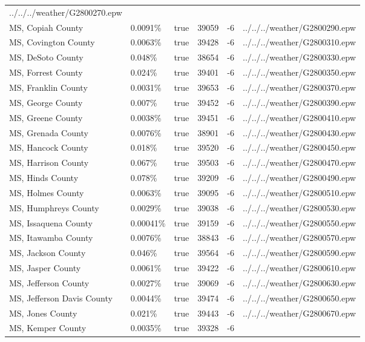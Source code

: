 \begin{longtable}[]{@{}llllll@{}}
../../../weather/G2800270.epw \\
MS, Copiah County & 0.0091\% & true & 39059 & -6 &
../../../weather/G2800290.epw \\
MS, Covington County & 0.0063\% & true & 39428 & -6 &
../../../weather/G2800310.epw \\
MS, DeSoto County & 0.048\% & true & 38654 & -6 &
../../../weather/G2800330.epw \\
MS, Forrest County & 0.024\% & true & 39401 & -6 &
../../../weather/G2800350.epw \\
MS, Franklin County & 0.0031\% & true & 39653 & -6 &
../../../weather/G2800370.epw \\
MS, George County & 0.007\% & true & 39452 & -6 &
../../../weather/G2800390.epw \\
MS, Greene County & 0.0038\% & true & 39451 & -6 &
../../../weather/G2800410.epw \\
MS, Grenada County & 0.0076\% & true & 38901 & -6 &
../../../weather/G2800430.epw \\
MS, Hancock County & 0.018\% & true & 39520 & -6 &
../../../weather/G2800450.epw \\
MS, Harrison County & 0.067\% & true & 39503 & -6 &
../../../weather/G2800470.epw \\
MS, Hinds County & 0.078\% & true & 39209 & -6 &
../../../weather/G2800490.epw \\
MS, Holmes County & 0.0063\% & true & 39095 & -6 &
../../../weather/G2800510.epw \\
MS, Humphreys County & 0.0029\% & true & 39038 & -6 &
../../../weather/G2800530.epw \\
MS, Issaquena County & 0.00041\% & true & 39159 & -6 &
../../../weather/G2800550.epw \\
MS, Itawamba County & 0.0076\% & true & 38843 & -6 &
../../../weather/G2800570.epw \\
MS, Jackson County & 0.046\% & true & 39564 & -6 &
../../../weather/G2800590.epw \\
MS, Jasper County & 0.0061\% & true & 39422 & -6 &
../../../weather/G2800610.epw \\
MS, Jefferson County & 0.0027\% & true & 39069 & -6 &
../../../weather/G2800630.epw \\
MS, Jefferson Davis County & 0.0044\% & true & 39474 & -6 &
../../../weather/G2800650.epw \\
MS, Jones County & 0.021\% & true & 39443 & -6 &
../../../weather/G2800670.epw \\
MS, Kemper County & 0.0035\% & true & 39328 & -6 &

\end{longtable}
